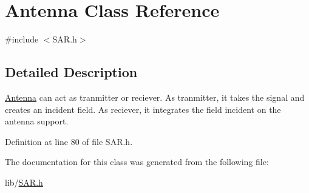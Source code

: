 \hypertarget{class_antenna}{}\section{Antenna Class Reference}
\label{class_antenna}


{\ttfamily \#include $<$S\+A\+R.\+h$>$}



\subsection{Detailed Description}
\hyperlink{class_antenna}{Antenna} can act as tranmitter or reciever. As tranmitter, it takes the signal and creates an incident field. As reciever, it integrates the field incident on the antenna support. 

Definition at line 80 of file S\+A\+R.\+h.



The documentation for this class was generated from the following file\+:\begin{DoxyCompactItemize}
\item 
lib/\hyperlink{_s_a_r_8h}{S\+A\+R.\+h}\end{DoxyCompactItemize}
